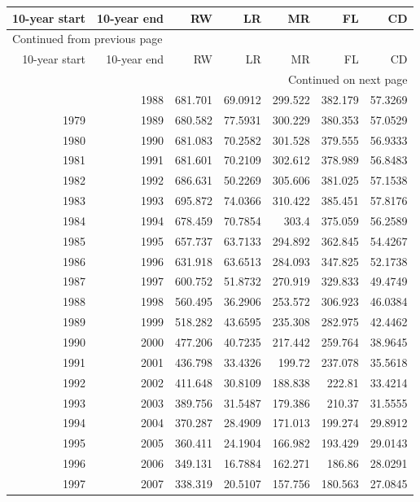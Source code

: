\documentclass[a4paper,titlepage]{article}
\begin{document}
\begin{longtable}{rrrrrrr}
10-year start & 10-year end & RW & LR & MR & FL & CD\\
\hline
\endfirsthead
\multicolumn{7}{l}{Continued from previous page} \\
\hline

10-year start & 10-year end & RW & LR & MR & FL & CD \\

\hline
\endhead
\hline\multicolumn{7}{r}{Continued on next page} \\
\endfoot
\endlastfoot
\hline
1978 & 1988 & 681.701 & 69.0912 & 299.522 & 382.179 & 57.3269\\
1979 & 1989 & 680.582 & 77.5931 & 300.229 & 380.353 & 57.0529\\
1980 & 1990 & 681.083 & 70.2582 & 301.528 & 379.555 & 56.9333\\
1981 & 1991 & 681.601 & 70.2109 & 302.612 & 378.989 & 56.8483\\
1982 & 1992 & 686.631 & 50.2269 & 305.606 & 381.025 & 57.1538\\
1983 & 1993 & 695.872 & 74.0366 & 310.422 & 385.451 & 57.8176\\
1984 & 1994 & 678.459 & 70.7854 & 303.4 & 375.059 & 56.2589\\
1985 & 1995 & 657.737 & 63.7133 & 294.892 & 362.845 & 54.4267\\
1986 & 1996 & 631.918 & 63.6513 & 284.093 & 347.825 & 52.1738\\
1987 & 1997 & 600.752 & 51.8732 & 270.919 & 329.833 & 49.4749\\
1988 & 1998 & 560.495 & 36.2906 & 253.572 & 306.923 & 46.0384\\
1989 & 1999 & 518.282 & 43.6595 & 235.308 & 282.975 & 42.4462\\
1990 & 2000 & 477.206 & 40.7235 & 217.442 & 259.764 & 38.9645\\
1991 & 2001 & 436.798 & 33.4326 & 199.72 & 237.078 & 35.5618\\
1992 & 2002 & 411.648 & 30.8109 & 188.838 & 222.81 & 33.4214\\
1993 & 2003 & 389.756 & 31.5487 & 179.386 & 210.37 & 31.5555\\
1994 & 2004 & 370.287 & 28.4909 & 171.013 & 199.274 & 29.8912\\
1995 & 2005 & 360.411 & 24.1904 & 166.982 & 193.429 & 29.0143\\
1996 & 2006 & 349.131 & 16.7884 & 162.271 & 186.86 & 28.0291\\
1997 & 2007 & 338.319 & 20.5107 & 157.756 & 180.563 & 27.0845\\

\end{longtable}
\end{document}

